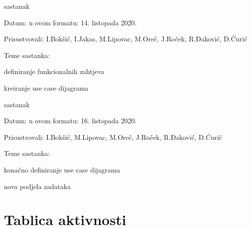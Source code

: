 \begin{packed_enum}
				\item  sastanak
			\item[] \begin{packed_item}
				\item Datum: u ovom formatu: 14. listopada 2020.
				\item Prisustvovali: I.Bokšić, I.Jakas, M.Lipovac, M.Oreč, J.Roček, R.Đaković, D.Ćurić
				\item Teme sastanka:
				\begin{packed_item}
					\item definiranje funkcionalnih zahtjeva 
					\item kreiranje use case dijagrama
				\end{packed_item}
			\end{packed_item}
				\item  sastanak
			\item[] \begin{packed_item}
				\item Datum: u ovom formatu: 16. listopada 2020.
				\item Prisustvovali: I.Bokšić, M.Lipovac, M.Oreč, J.Roček, R.Đaković, D.Ćurić
				\item Teme sastanka:
				\begin{packed_item}
					\item konačno definiranje use case dijagrama
					\item nova podjela zadataka
				\end{packed_item}
			\end{packed_item}
		\end{packed_enum}
		
		\eject
		\section*{Tablica aktivnosti}
		
			
					
						
			
